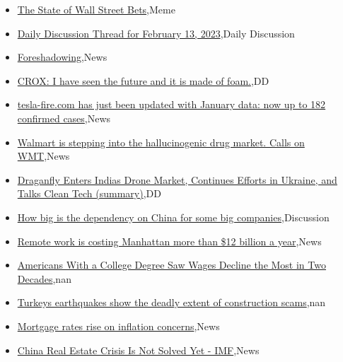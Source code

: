 \documentclass{article}%
\begin{document}
%
\begin{itemize}%
\item%
\href{https://reddit.com/r/wallstreetbets/comments/1116ska/the\_state\_of\_wall\_street\_bets/}{The State of Wall Street Bets},Meme%
\item%
\href{https://reddit.com/r/wallstreetbets/comments/1115m4a/daily\_discussion\_thread\_for\_february\_13\_2023/}{Daily Discussion Thread for February 13, 2023},Daily Discussion%
\item%
\href{https://reddit.com/r/wallstreetbets/comments/1112uel/foreshadowing/}{Foreshadowing},News%
\item%
\href{https://reddit.com/r/wallstreetbets/comments/11123za/crox\_i\_have\_seen\_the\_future\_and\_it\_is\_made\_of\_foam/}{CROX: I have seen the future and it is made of foam.},DD%
\item%
\href{https://reddit.com/r/wallstreetbets/comments/11123p1/teslafirecom\_has\_just\_been\_updated\_with\_january/}{tesla-fire.com has just been updated with January data: now up to 182 confirmed cases},News%
\item%
\href{https://reddit.com/r/wallstreetbets/comments/1110gjk/walmart\_is\_stepping\_into\_the\_hallucinogenic\_drug/}{Walmart is stepping into the hallucinogenic drug market. Calls on WMT},News%
\item%
\href{https://reddit.com/r/Baystreetbets/comments/110eg4a/draganfly\_enters\_indias\_drone\_market\_continues/}{Draganfly Enters Indias Drone Market, Continues Efforts in Ukraine, and Talks Clean Tech (summary)},DD%
\item%
\href{https://reddit.com/r/StockMarket/comments/1111w76/how\_big\_is\_the\_dependency\_on\_china\_for\_some\_big/}{How big is the dependency on China for some big companies},Discussion%
\item%
\href{https://reddit.com/r/Economics/comments/1116d1r/remote\_work\_is\_costing\_manhattan\_more\_than\_12/}{Remote work is costing Manhattan more than \$12 billion a year},News%
\item%
\href{https://reddit.com/r/Economics/comments/1113te9/americans\_with\_a\_college\_degree\_saw\_wages\_decline/}{Americans With a College Degree Saw Wages Decline the Most in Two Decades},nan%
\item%
\href{https://reddit.com/r/Economics/comments/1112geh/turkeys\_earthquakes\_show\_the\_deadly\_extent\_of/}{Turkeys earthquakes show the deadly extent of construction scams},nan%
\item%
\href{https://reddit.com/r/Economics/comments/110letb/mortgage\_rates\_rise\_on\_inflation\_concerns/}{Mortgage rates rise on inflation concerns},News%
\item%
\href{https://reddit.com/r/Economics/comments/110eclv/china\_real\_estate\_crisis\_is\_not\_solved\_yet\_imf/}{China Real Estate Crisis Is Not Solved Yet - IMF},News%
\end{itemize}%
\end{document}
